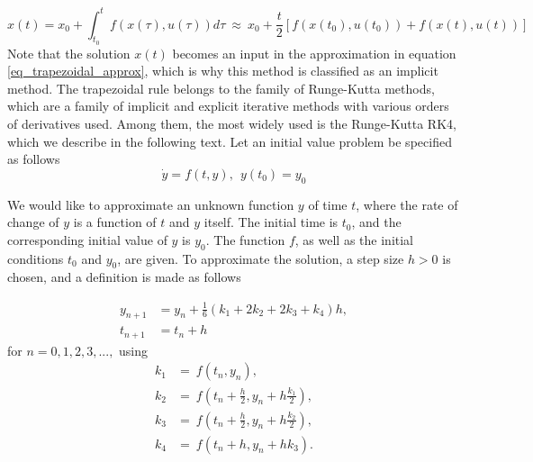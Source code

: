 \documentclass  [
  paper    = a4,
  BCOR     = 10mm,
  twoside,
  fontsize = 12pt,
  fleqn,
  toc      = bibnumbered,
  toc      = listofnumbered,
  numbers  = noendperiod,
  headings = normal,
  listof   = leveldown,
  version  = 3.03
]                                       {scrreprt}
\newcommand{\<}{\langle}
\renewcommand{\>}{\rangle}
\begin{document}
\begin{equation}
	x(t)  = x_0  + \int_{t_0}^{t}  f(x(\tau), u(\tau)) d \tau \ \approx \   x_0  + \frac{t}{2}[f(x(t_0), u(t_0)) + f(x(t), u(t))]  
	\label{eq_trapezoidal_approx}
\end{equation}
Note that the solution $x(t)$ becomes an input in the approximation in equation \ref{eq_trapezoidal_approx}, which is why this method is classified as an implicit method. The trapezoidal rule belongs to the family of Runge-Kutta methods, which are a family of implicit and explicit iterative methods with various orders of derivatives used. Among them, the most widely used is the Runge-Kutta RK4, which we describe in the following text. Let an initial value problem be specified as follows
\begin{equation}\label{eqn:RK4_diff}
	\dot{y} = f(t, y), \ \ y(t_0) = y_0
\end{equation}

We would like to approximate an unknown function $y$ of time $t$, where the rate of change of $y$ is a function of $t$ and $y$ itself. The initial time is $t_0$, and the corresponding initial value of $y$ is $y_0$. The function $f$, as well as the initial conditions $t_0$ and $y_0$, are given. To approximate the solution, a step size $h>0$ is chosen, and a definition is made as follows

  	\begin{align}
  		y_{n+1} &= y_n + \frac{1}{6}\left(k_1 + 2k_2 + 2k_3 + k_4 \right)h,\\
  		t_{n+1} &= t_n + h
  	\end{align}
  	for $n = 0, 1, 2, 3, ...,$ using
  	\begin{align}
  		k_1 &= \ f(t_n, y_n), \\
  		k_2 &= \ f\!\left(t_n + \frac{h}{2}, y_n + h\frac{k_1}{2}\right), \\ 
  		k_3 &= \ f\!\left(t_n + \frac{h}{2}, y_n + h\frac{k_2}{2}\right), \\
  		k_4 &= \ f\!\left(t_n + h, y_n + hk_3\right).
  	\end{align}
  	
\end{document}
